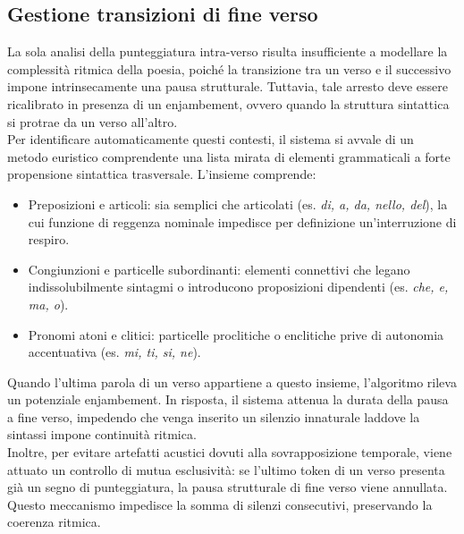 \subsection{Gestione transizioni di fine verso}
La sola analisi della punteggiatura intra-verso risulta insufficiente a modellare la complessità ritmica della poesia, poiché la transizione tra un 
verso e il successivo impone intrinsecamente una pausa strutturale. Tuttavia, tale arresto deve essere ricalibrato in presenza di un enjambement, 
ovvero quando la struttura sintattica si protrae da un verso all'altro.\\
Per identificare automaticamente questi contesti, il sistema si avvale di un metodo euristico comprendente una lista mirata di elementi grammaticali 
a forte propensione sintattica trasversale. L'insieme comprende:
\begin{itemize}
      \item Preposizioni e articoli: sia semplici che articolati (es. \textit{di, a, da, nello, del}), la cui funzione di reggenza nominale impedisce 
      per definizione un'interruzione di respiro.
      \item Congiunzioni e particelle subordinanti: elementi connettivi che legano indissolubilmente sintagmi o introducono proposizioni dipendenti 
      (es. \textit{che, e, ma, o}).
      \item Pronomi atoni e clitici: particelle proclitiche o enclitiche prive di autonomia accentuativa (es. \textit{mi, ti, si, ne}).
\end{itemize}
Quando l'ultima parola di un verso appartiene a questo insieme, l'algoritmo rileva un potenziale enjambement. In risposta, il sistema attenua la durata 
della pausa a fine verso, impedendo che venga inserito un silenzio innaturale laddove la sintassi impone continuità ritmica.\\
Inoltre, per evitare artefatti acustici dovuti alla sovrapposizione temporale, viene attuato un controllo di mutua esclusività: se l'ultimo token di un 
verso presenta già un segno di punteggiatura, la pausa strutturale di fine verso viene annullata. Questo meccanismo impedisce la somma di silenzi consecutivi, 
preservando la coerenza ritmica. 


